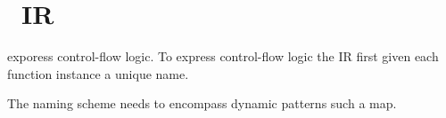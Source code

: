 

\section{\name~IR}\label{sec:ir}

exporess control-flow logic. To express control-flow logic the IR first given
each function instance a unique name.

The naming scheme needs to encompass dynamic patterns such a map.

